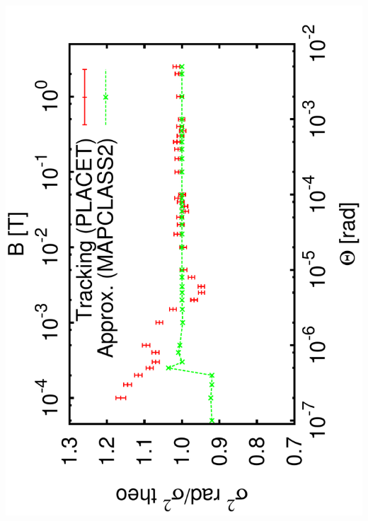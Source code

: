 \documentclass{beamer}
\begin{document}
\begin{frame}
 \includegraphics[scale=0.24,angle=-90]{sigma_angle_r06.pdf}
 \twisslogo
 \ptctwisslogo
\end{frame}


% 
\end{document}
